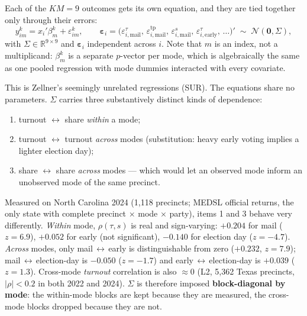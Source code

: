 \documentclass[11pt]{article}
\newcommand{\tp}{\mathrm{tp}}
\newcommand{\Norm}{\mathcal{N}}
\begin{document}
Each of the $K M = 9$ outcomes gets its own equation, and they are tied together only
through their errors:
\begin{equation}
  y^{k}_{im} = x_i' \beta^{k}_{m} + \varepsilon^{k}_{im},
  \qquad
  \boldsymbol\varepsilon_i = \big(\varepsilon^{\tau}_{i,\textrm{mail}},\,
  \varepsilon^{\tp}_{i,\textrm{mail}},\, \varepsilon^{s}_{i,\textrm{mail}},\,
  \varepsilon^{\tau}_{i,\textrm{early}},\, \dots\big)'
  \;\sim\; \Norm(\mathbf{0}, \Sigma),
  \label{eq:sur}
\end{equation}
with $\Sigma \in \mathbb{R}^{9\times 9}$ and $\boldsymbol\varepsilon_i$ independent across
$i$. Note that $m$ is an index, not a multiplicand: $\beta^{k}_{m}$ is a separate
$p$-vector per mode, which is algebraically the same as one pooled regression with mode
dummies interacted with every covariate.

This is Zellner's seemingly unrelated regressions (SUR). The equations share no
parameters. $\Sigma$ carries three substantively distinct kinds of dependence:
\begin{enumerate}
  \item turnout $\leftrightarrow$ share \emph{within} a mode;
  \item turnout $\leftrightarrow$ turnout \emph{across} modes (substitution: heavy early
        voting implies a lighter election day);
  \item share $\leftrightarrow$ share \emph{across} modes --- which would let an observed
        mode inform an unobserved mode of the same precinct.
\end{enumerate}

\noindent Measured on North Carolina 2024 (1{,}118 precincts; MEDSL official returns, the
only state with complete precinct $\times$ mode $\times$ party), items 1 and 3 behave very
differently. \emph{Within} mode, $\rho(\tau,s)$ is real and sign-varying: $+0.204$ for mail
($z=6.9$), $+0.052$ for early (not significant), $-0.140$ for election day ($z=-4.7$).
\emph{Across} modes, only mail\,$\leftrightarrow$\,early is distinguishable from zero
($+0.232$, $z=7.9$); mail\,$\leftrightarrow$\,election-day is $-0.050$ ($z=-1.7$) and
early\,$\leftrightarrow$\,election-day is $+0.039$ ($z=1.3$). Cross-mode \emph{turnout}
correlation is also $\approx 0$ (L2, 5{,}362 Texas precincts, $|\rho|<0.2$ in both 2022 and
2024). $\Sigma$ is therefore imposed \textbf{block-diagonal by mode}: the within-mode blocks
are kept because they are measured, the cross-mode blocks dropped because they are not.
\end{document}
